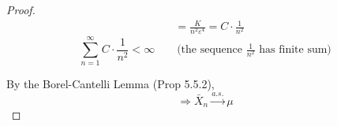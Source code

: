 \begin{theorem}
\begin{proof}
\begin{align*}
            &= \frac{K}{n^2\varepsilon^4} = C\cdot\frac{1}{n^2}
        \end{align*}
        \[\sum_{n=1}^\infty C\cdot\frac{1}{n^2} < \infty \qquad \text{(the sequence $\tfrac{1}{n^2}$ has finite sum)}\]
        \begin{center}
        \end{center}
        By the Borel-Cantelli Lemma (Prop 5.5.2),
        \[\Rightarrow \bar{X}_n \overset{a.s.}{\longrightarrow} \mu\]
    \end{proof}
\end{theorem}
